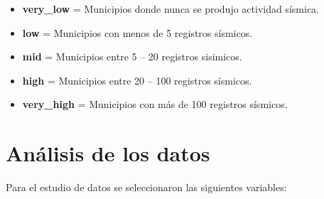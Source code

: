 \documentclass[12pt]{article}
\begin{document}
\begin{itemize}
\item\textbf{very\_low} 	= Municipios donde nunca se produjo actividad sísmica.
\item \textbf{low}		= Municipios con menos de 5 registros sísmicos.
\item \textbf{mid}	= Municipios entre 5 – 20 registros sisimicos.
\item \textbf{high}	= Municipios entre 20 – 100 registros sísmicos.
\item \textbf{very\_high}	= Municipios con más de 100 registros sísmicos.
\end{itemize}




\section{Análisis  de los datos}

Para el estudio de datos se seleccionaron las siguientes variables:
\end{document}
